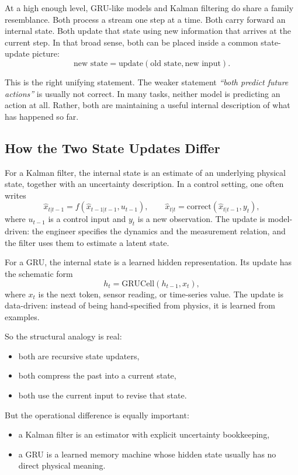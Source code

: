 \documentclass[12pt,a4paper]{article}
\begin{document}
At a high enough level, GRU-like models and Kalman filtering do share a family resemblance. Both process a stream one step at a time. Both carry forward an internal state. Both update that state using new information that arrives at the current step. In that broad sense, both can be placed inside a common state-update picture:
\[
\text{new state} = \text{update}(\text{old state}, \text{new input}).
\]

This is the right unifying statement. The weaker statement
\emph{``both predict future actions''}
is usually not correct. In many tasks, neither model is predicting an action at all. Rather, both are maintaining a useful internal description of what has happened so far.

\subsection{How the Two State Updates Differ}

For a Kalman filter, the internal state is an estimate of an underlying physical state, together with an uncertainty description. In a control setting, one often writes
\[
\hat{x}_{t|t-1} = f(\hat{x}_{t-1|t-1}, u_{t-1}),
\qquad
\hat{x}_{t|t} = \text{correct}(\hat{x}_{t|t-1}, y_t),
\]
where \(u_{t-1}\) is a control input and \(y_t\) is a new observation. The update is model-driven: the engineer specifies the dynamics and the measurement relation, and the filter uses them to estimate a latent state.

For a GRU, the internal state is a learned hidden representation. Its update has the schematic form
\[
h_t = \text{GRUCell}(h_{t-1}, x_t),
\]
where \(x_t\) is the next token, sensor reading, or time-series value. The update is data-driven: instead of being hand-specified from physics, it is learned from examples.

So the structural analogy is real:
\begin{itemize}
  \item both are recursive state updaters,
  \item both compress the past into a current state,
  \item both use the current input to revise that state.
\end{itemize}

But the operational difference is equally important:
\begin{itemize}
  \item a Kalman filter is an estimator with explicit uncertainty bookkeeping,
  \item a GRU is a learned memory machine whose hidden state usually has no direct physical meaning.
\end{itemize}
\end{document}
